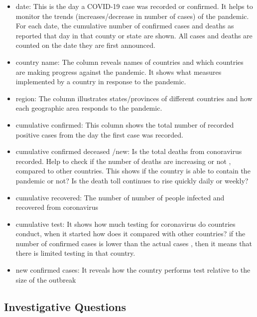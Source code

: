\documentclass[12pt,letterpaper, twoside]{article}
\begin{document}
\begin{itemize}
    \item date: This is the day a COVID-19 case was recorded or confirmed. It helps to monitor the trends (increases/decrease in number of cases) of the pandemic.
    For each date, the cumulative number of confirmed cases and deaths as reported that day in that county or state are shown. All cases and deaths are counted on the date they are first announced.
    
    \item country name: The column reveals names of countries and which countries are making progress against the pandemic. It shows what measures implemented by a country in response to the pandemic.
    
    \item region:  The column illustrates states/provinces of different countries and how each geographic area responds to the pandemic.
    
    \item cumulative confirmed: This column shows the total number of recorded positive cases from the day the first case was recorded. 
      
    \item cumulative confirmed deceased /new:  Is the total deaths from conoravirus recorded. Help to check if the number of deaths are increasing or not , compared to other countries. This shows if the country is able to contain the pandemic or not? Is the death toll continues to rise quickly daily or weekly?
    
    \item cumulative recovered: The number of number of people infected and recovered from coronavirus
      
     \item cumulative test:  It shows how much testing for coronavirus do countries conduct, when it started how does it compared with other countries? if the number of confirmed cases is lower than the actual cases , then it means that there is limited testing in that country.
      
    \item new confirmed cases:  It reveals how the country performs test relative to the size of the outbreak
    
\end{itemize}


\subsection{Investigative Questions}
\end{document}
